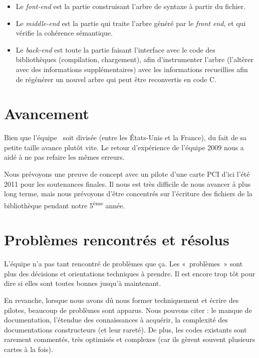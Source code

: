 \documentclass[francais]{rtxreport}
\begin{document}
\begin{itemize}
	\item Le \emph{font-end} est la partie construisant l’arbre de syntaxe à
          partir du fichier.
	\item Le \emph{middle-end} est la partie qui traite l’arbre généré par
          le \emph{front end}, et qui vérifie la cohérence sémantique.
	\item Le \emph{back-end} est toute la partie faisant l’interface avec le
          code des bibliothèques (compilation, chargement), afin d'instrumenter
          l'arbre (l’altèrer avec des informations supplémentaires) avec les
          informations recueillies afin de régénérer un nouvel arbre qui peut
          être reconvertis en code C.
\end{itemize}

\section{Avancement}

Bien que l'équipe \rtx\ soit divisée (entre les États-Unis et la France), du
fait de sa petite taille avance plutôt vite. Le retour d'expérience de l'équipe
2009 nous a aidé à ne pas refaire les mêmes erreurs.

Nous prévoyons une preuve de concept avec un pilote d’une carte PCI d’ici l'été
2011 pour les soutenances finales. Il nous est très difficile de nous avancer à
plus long terme, mais nous prévoyons d’être concentrés sur l’écriture des
fichiers de la bibliothèque pendant notre 5\textsuperscript{ème} année.

\section{Problèmes rencontrés et résolus}

L’équipe n’a pas tant rencontré de problèmes que ça. Les «~problèmes~» sont plus
des décisions et orientations techniques à prendre. Il est encore trop tôt pour
dire si elles sont toutes bonnes jusqu’à maintenant.

En revanche, lorsque nous avons dû nous former techniquement et écrire des
pilotes, beaucoup de problèmes sont apparus. Nous pouvons citer : le manque de
documentation, l’étendue des connaissances à acquérir, la complexité des
documentations constructeurs (et leur rareté). De plus, les codes existants sont
rarement commentés, très optimisés et complexes (car ils gèrent souvent
plusieurs cartes à la fois).
\end{document}

